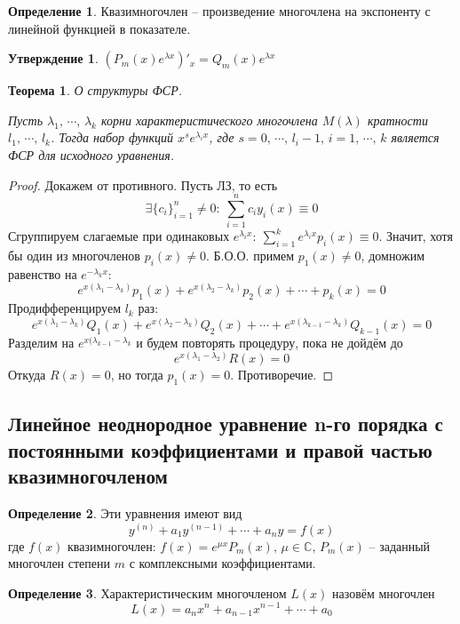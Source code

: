 \documentclass[a4paper,12pt]{article}
\theoremstyle{plain}
\newtheorem{theorem}{Теорема}[section]
\newtheorem{proposition}{Утверждение}[section]
\theoremstyle{definition}
\newtheorem{definition}{Определение}[section]
\theoremstyle{remark}
\begin{document}
\begin{definition}
	Квазимногочлен -- произведение многочлена на экспоненту с линейной функцией в показателе.
\end{definition}

\begin{proposition}
	$(P_m(x)e^{\lambda x})'_x = Q_m(x)e^{\lambda x}$
\end{proposition}

\begin{theorem}
	О структуры ФСР.

	Пусть $\lambda_1,\,\cdots,\, \lambda_k$ корни характеристического многочлена $M(\lambda)$ кратности $l_1,\,\cdots,\,l_k$. Тогда набор функций $x^se^{\lambda_i x}$, где $s = 0,\,\cdots,\,l_i - 1,\, i = 1,\,\cdots,\,k$ является ФСР для исходного уравнения.
\end{theorem}

\begin{proof}
	Докажем от противного. Пусть ЛЗ, то есть
	\[\exists \{c_i\}_{i = 1}^n \neq 0:\: \sum_{i = 1}^n c_iy_i(x) \equiv 0\]
	Сгруппируем слагаемые при одинаковых $e^{\lambda_i x}:\: \sum\limits_{i = 1}^k e^{\lambda_i x}p_i(x) \equiv 0$. Значит, хотя бы один из многочленов $p_i(x) \neq 0$. Б.О.О. примем $p_1(x) \neq 0$, домножим равенство на $e^{-\lambda_k x}$:
	\[e^{x(\lambda_1 - \lambda_k)}p_1(x) + e^{x(\lambda_2 - \lambda_k)}p_2(x) + \cdots + p_k(x) = 0\]
	Продифференцируем $l_k$ раз:
	\[e^{x(\lambda_1 - \lambda_k)}Q_1(x) + e^{x(\lambda_2 - \lambda_k)}Q_2(x) + \cdots + e^{x(\lambda_{k-1} - \lambda_k)}Q_{k-1}(x) = 0\]
	Разделим на $e^{x(\lambda_{k-1} - \lambda_k}$ и будем повторять процедуру, пока не дойдём до
	\[e^{x(\lambda_1 - \lambda_2)}R(x) = 0\]
	Откуда $R(x) = 0$, но тогда $p_1(x) = 0$. Противоречие.
\end{proof}

\subsection{Линейное неоднородное уравнение n-го порядка с постоянными коэффициентами и правой частью квазимногочленом}
\begin{definition}
	Эти уравнения имеют вид
	\[y^{(n)} + a_1y^{(n-1)} + \cdots + a_ny = f(x)\]
	где $f(x)$ квазимногочлен: $f(x) = e^{\mu x}P_m(x),\, \mu \in \mathbb{C},\, P_m(x)$ -- заданный многочлен степени $m$ с комплексными коэффициентами.
\end{definition}

\begin{definition}
	Характеристическим многочленом $L(x)$ назовём многочлен
	\[L(x) = a_nx^n + a_{n-1}x^{n-1} + \cdots + a_0\]
\end{definition}
\end{document}
